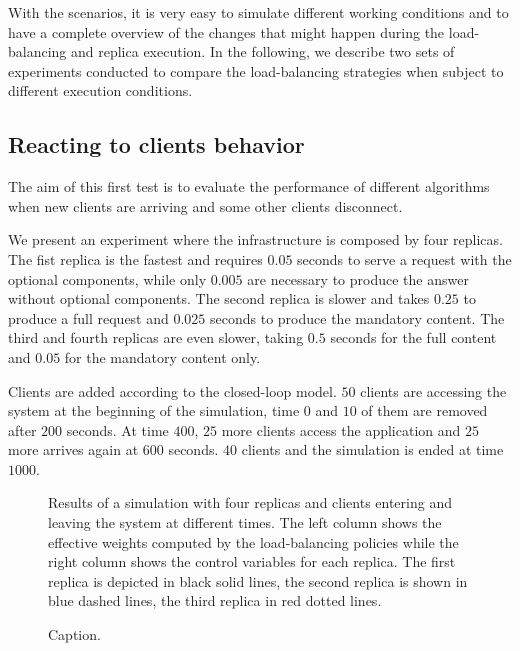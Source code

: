 With the scenarios, it is very easy to simulate different working
conditions and to have a complete overview of the changes that might
happen during the load-balancing and replica execution. In the following,
we describe two sets of experiments conducted to compare the load-balancing
strategies when subject to different execution conditions.

\subsection{Reacting to clients behavior}

The aim of this first test is to evaluate the performance of
different algorithms when new clients are arriving and some other clients
disconnect.

We present an experiment where the infrastructure is composed by four 
replicas. The fist replica is the fastest and requires $0.05$ seconds to 
serve a request with the optional components, while only $0.005$ are 
necessary to produce the answer without optional components. The second 
replica is slower and takes $0.25$ to produce a full request and $0.025$ 
seconds to produce the mandatory content. The third and fourth replicas 
are even slower, taking $0.5$ seconds for the full content and $0.05$ for 
the mandatory content only.

Clients are added according to the closed-loop model. $50$ clients are
accessing the system at the beginning of the simulation, time $0$ and $10$ of 
them are removed after $200$ seconds. At time $400$, $25$ more clients
access the application and $25$ more arrives again at $600$ seconds. 
$40$ clients and the simulation is ended at time $1000$.

\begin{figure}
\centering

\caption{Results of a simulation with four replicas and clients entering
and leaving the system at different times. The left column shows the
effective weights computed by the load-balancing policies while the
right column shows the control variables for each replica. The first
replica is depicted in black solid lines, the second replica is shown
in blue dashed lines, the third replica in red dotted lines.}
\label{fig:clientchanges-full}
\end{figure}

\begin{figure}
\centering

\vspace{-4mm}
\caption{Caption.}
\label{fig:clientchanges-boxplot}
\end{figure}

